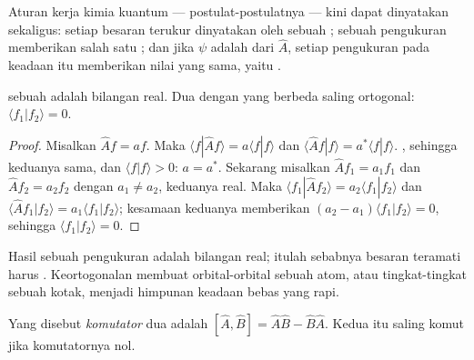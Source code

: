 Aturan kerja kimia kuantum --- postulat-postulatnya --- kini dapat dinyatakan
sekaligus: setiap besaran terukur dinyatakan oleh sebuah ;
sebuah pengukuran memberikan salah satu ; dan jika $\psi$
adalah  dari $\hat A$, setiap pengukuran pada keadaan itu
memberikan nilai yang sama, yaitu .

\begin{theorem}\label{thm:b3:quantum-model-systems:hermitian-real}
 sebuah  adalah bilangan real. Dua 
dengan  yang berbeda saling ortogonal: $\langle f_1|f_2\rangle = 0$.
\end{theorem}

\begin{proof}
Misalkan $\hat Af = af$. Maka $\langle f|\hat Af\rangle = a\langle f|f\rangle$
dan $\langle\hat Af|f\rangle = a^*\langle f|f\rangle$.  ,
sehingga keduanya sama, dan $\langle f|f\rangle > 0$: $a = a^*$. Sekarang
misalkan $\hat Af_1
= a_1f_1$ dan $\hat Af_2 = a_2f_2$ dengan $a_1 \ne a_2$,
keduanya real. Maka $\langle f_1|\hat Af_2\rangle = a_2\langle f_1|f_2\rangle$
dan $\langle\hat Af_1|
f_2\rangle = a_1\langle f_1|f_2\rangle$; kesamaan
keduanya memberikan $(a_2 - a_1)
\langle f_1|f_2\rangle = 0$, sehingga
$\langle f_1|f_2\rangle = 0$.
\end{proof}

Hasil sebuah pengukuran adalah bilangan real; itulah sebabnya besaran
teramati harus . Keortogonalan membuat orbital-orbital sebuah atom,
atau tingkat-tingkat sebuah kotak, menjadi himpunan keadaan bebas yang rapi.

\begin{definition}[Komutator]\label{def:b3:quantum-model-systems:commutator}
Yang disebut \emph{komutator} dua  adalah
$[\hat A,\hat B] =
\hat A\hat B - \hat B\hat A$. Kedua  itu saling
komut jika komutatornya nol.
\end{definition}

